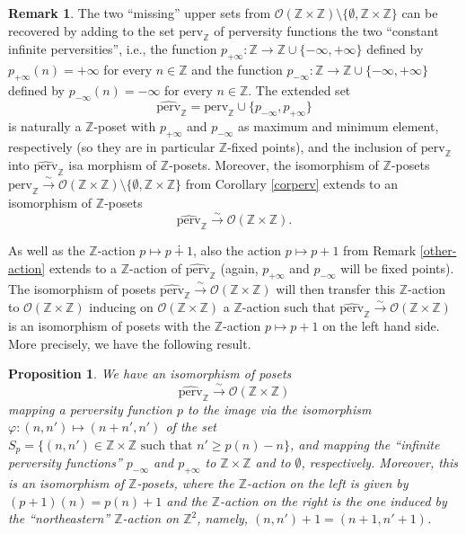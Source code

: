\documentclass{article}
\newtheorem{prop}[thm]{Proposition}
\theoremstyle{definition}
\newtheorem{rem}[thm]{Remark}
\newcommand{\Z}{\mathbb{Z}}
\newcommand{\Oo}{\mathcal{O}}
\begin{document}
\begin{rem}\label{missing}
The two ``missing'' upper sets from $\Oo(\Z\times \Z)\setminus\{\emptyset,\Z\times\Z\}$ can be recovered by adding to the set $\mathrm{perv}_\Z$ of perversity functions the two ``constant infinite perversities'', i.e., the function $p_{+\infty}\colon \Z\to \Z\cup\{-\infty,+\infty\}$ defined by $p_{+\infty}(n)=+\infty$ for every $n\in\Z$ and the function  $p_{-\infty}\colon \Z\to \Z\cup\{-\infty,+\infty\}$ defined by $p_{-\infty}(n)=-\infty$ for every $n\in\Z$. The extended set
\[
\widehat{\mathrm{perv}}_\Z =\mathrm{perv}_\Z\cup\{p_{-\infty},p_{+\infty}\}
\]
is naturally a $\Z$-poset with $p_{+\infty}$ and $p_{-\infty}$ as maximum and minimum element, respectively (so they are in particular $\Z$-fixed points), and the inclusion of $\mathrm{perv}_\Z$ into $\widehat{\mathrm{perv}}_\Z$ isa morphism of $\Z$-posets. Moreover, the isomorphism of $\Z$-posets $\mathrm{perv}_\Z\xrightarrow{\sim} \Oo(\Z\times \Z)\setminus\{\emptyset,\Z\times\Z\}$ from Corollary \ref{corperv} extends to an isomorphism of $\Z$-posets
\[
\widehat{\mathrm{perv}}_\Z\xrightarrow{\sim} \Oo(\Z\times \Z).
\]
\end{rem}
As well as the $\Z$-action $p\mapsto p\dotplus 1$, also the action $p\mapsto p+1$ from Remark \ref{other-action} extends to a $\Z$-action of $\widehat{\mathrm{perv}}_\Z$ (again, $p_{+\infty}$ and $p_{-\infty}$ will be fixed points). The isomorphism of posets $\widehat{\mathrm{perv}}_\Z\xrightarrow{\sim} \Oo(\Z\times \Z)$ will then transfer this $\Z$-action to $\Oo(\Z\times \Z)$ inducing on $\Oo(\Z\times \Z)$ a $\Z$-action such that $\widehat{\mathrm{perv}}_\Z\xrightarrow{\sim} \Oo(\Z\times \Z)$ is an isomorphism of posets with the $\Z$-action $p\mapsto p+1$ on the left hand side. More precisely, we have the following result.
\begin{prop}
\label{prop-perv}
We have an isomorphism of posets
\[
\widehat{\mathrm{perv}}_\Z\xrightarrow{\sim} \Oo(\Z\times \Z)
\]
mapping a perversity function $p$ to the image via the isomorphism $\varphi\colon (n,n')\mapsto (n+n',n')$ of the set $S_p=\{(n,n')\in \Z\times \Z\text{ such that } n'\geq p(n)-n\}$, and mapping the ``infinite perversity functions'' $p_{-\infty}$ and $p_{+\infty}$ to $\Z\times \Z$ and to $\emptyset$, respectively. Moreover, this is an isomorphism of $\Z$-posets, where the $\Z$-action on the left is given by $(p+1)(n)=p(n)+1$ and the $\Z$-action on the right is the one induced by the ``northeastern'' $\Z$-action on $\Z^2$, namely, $(n,n')+1=(n+1,n'+1)$. 
\end{prop}
\end{document}
